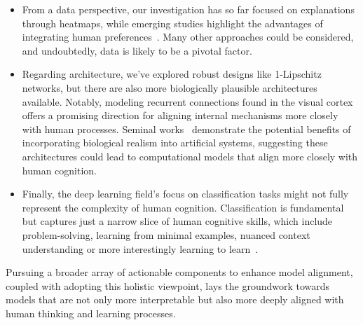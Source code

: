 \begin{itemize}

    \item From a data perspective, our investigation has so far focused on explanations through heatmaps, while emerging studies highlight the advantages of integrating human preferences~\cite{muttenthaler2024improving}. Many other approaches could be considered, and undoubtedly, data is likely to be a pivotal factor.
    
    \item Regarding architecture, we've explored robust designs like 1-Lipschitz networks, but there are also more biologically plausible architectures~\cite{serre2006learning} available. Notably, modeling recurrent connections found in the visual cortex offers a promising direction for aligning internal mechanisms more closely with human processes. Seminal works~\cite{linsley2020stable,chalvidal2020go} demonstrate the potential benefits of incorporating biological realism into artificial systems, suggesting these architectures could lead to computational models that align more closely with human cognition.

    \item Finally, the deep learning field's focus on classification tasks might not fully represent the complexity of human cognition. Classification is fundamental but captures just a narrow slice of human cognitive skills, which include problem-solving, learning from minimal examples, nuanced context understanding or more interestingly learning to learn~\cite{chalvidal2022meta}. 

\end{itemize}

Pursuing a broader array of actionable components to enhance model alignment, coupled with adopting this holistic viewpoint, lays the groundwork towards models that are not only more interpretable but also more deeply aligned with human thinking and learning processes.

